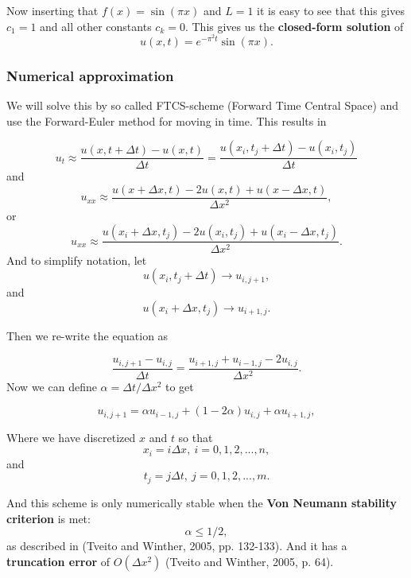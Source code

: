 Now inserting that $f(x)=\sin(\pi x)$ and $L=1$ it is easy to see that this
gives $c_1=1$ and all other constants $c_k=0$. This gives us the \textbf{closed-form
solution} of
\begin{equation*}
    u(x,t)=e^{-\pi^2 t}\sin{\left(\pi x\right)}.
\end{equation*}

\subsubsection{Numerical approximation}
We will solve this by so called FTCS-scheme (Forward Time Central Space) and
use the Forward-Euler method for moving in time. This results in

\begin{equation*}
u_t\approx \frac{u(x,t+\Delta t)-u(x,t)}{\Delta t}=\frac{u(x_i,t_j+\Delta t)-u(x_i,t_j)}{\Delta t}
\end{equation*}
and
\begin{equation*}
u_{xx}\approx \frac{u(x+\Delta x,t)-2u(x,t)+u(x-\Delta x,t)}{\Delta x^2},
\end{equation*}
or
\begin{equation*}
    u_{xx}\approx \frac{u(x_i+\Delta x,t_j)-2u(x_i,t_j)+u(x_i-\Delta x,t_j)}{\Delta x^2}.
\end{equation*}
And to simplify notation, let
\begin{equation*}
    u(x_i, t_j + \Delta t)\rightarrow u_{i,j+1},
\end{equation*}
and
\begin{equation*}
    u(x_i+\Delta x, t_j) \rightarrow u_{i+1, j}.
\end{equation*}

Then we re-write the equation as

$$
    \frac{u_{i,j+1}-u_{i,j}}{\Delta t} = \frac{u_{i+1,j}+u_{i-1,j}-2u_{i,j}}{\Delta
    x^2}.
$$
Now we can define $\alpha=\Delta t / \Delta x^2$ to get

\begin{equation}
    u_{i,j+1}=\alpha u_{i-1,j} + (1-2\alpha) u_{i,j}+\alpha u_{i+1,j},
\end{equation}

Where we have discretized $x$ and $t$ so that
$$
    x_i = i\Delta x,\ i=0,1,2,...,n,
$$
and
$$
    t_j = j\Delta t,\ j=0,1,2,...,m.
$$

And this scheme is only numerically stable when the \textbf{Von Neumann
stability criterion} is met:
$$
    \alpha\leq 1/2,
$$ 
as described in (Tveito and
Winther, 2005, pp. 132-133)\cite{tveito}. And it has a \textbf{truncation
error} of
$O(\Delta x^2)$ (Tveito and Winther, 2005, p. 64).

